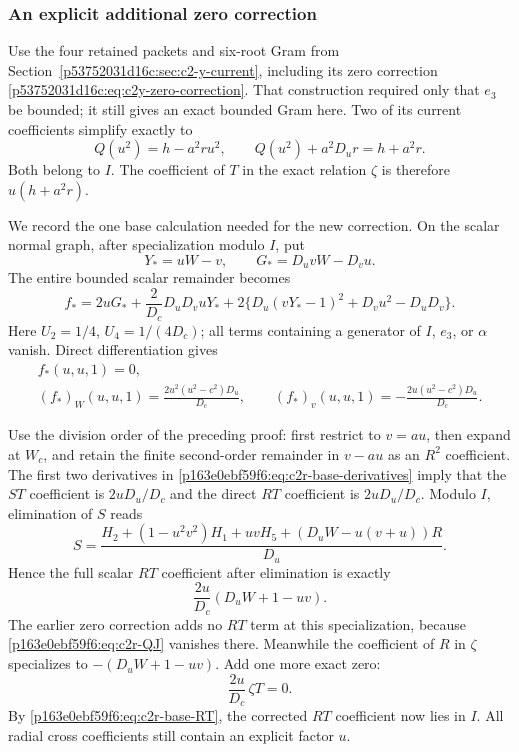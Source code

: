 \subsubsection*{An explicit additional zero correction}
Use the four retained packets and six-root Gram from
Section~\ref{p53752031d16c:sec:c2-y-current}, including its zero correction
\eqref{p53752031d16c:eq:c2y-zero-correction}.  That construction required only that
$e_3$ be bounded; it still gives an exact bounded Gram here.  Two of its
current coefficients simplify exactly to
\begin{equation}
Q(u^2)=h-a^2ru^2,\qquad Q(u^2)+a^2D_ur=h+a^2r.
\label{p163e0ebf59f6:eq:c2r-QJ}
\end{equation}
Both belong to $I$.  The coefficient of $T$ in the exact relation
$\zeta$ is therefore $u(h+a^2r)$.

We record the one base calculation needed for the new correction.
On the scalar normal graph, after specialization modulo $I$, put
\[
Y_*=uW-v,\qquad G_*=D_uvW-D_vu.
\]
The entire bounded scalar remainder becomes
\begin{equation}
f_*=2uG_*+\frac{2}{D_c}D_uD_vuY_*
 +2\{D_u(vY_*-1)^2+D_vu^2-D_uD_v\}.
\label{p163e0ebf59f6:eq:c2r-base-polynomial}
\end{equation}
Here $U_2=1/4$, $U_4=1/(4D_c)$; all terms containing a generator of
$I$, $e_3$, or $\alpha$ vanish.  Direct differentiation gives
\begin{equation}
\begin{gathered}
f_*(u,u,1)=0,\\
(f_*)_W(u,u,1)=\frac{2u^2(u^2-c^2)D_u}{D_c},\qquad
(f_*)_v(u,u,1)=-\frac{2u(u^2-c^2)D_u}{D_c}.
\end{gathered}
\label{p163e0ebf59f6:eq:c2r-base-derivatives}
\end{equation}

Use the division order of the preceding proof: first restrict to $v=au$,
then expand at $W_c$, and retain the finite second-order remainder in
$v-au$ as an $R^2$ coefficient.  The first two derivatives in
\eqref{p163e0ebf59f6:eq:c2r-base-derivatives} imply that the $ST$ coefficient is
$2uD_u/D_c$ and the direct $RT$ coefficient is $2uD_u/D_c$.
Modulo $I$, elimination of $S$ reads
\[
S=\frac{H_2+(1-u^2v^2)H_1+uvH_5
 +(D_uW-u(v+u))R}{D_u}.
\]
Hence the full scalar $RT$ coefficient after elimination is exactly
\begin{equation}
\frac{2u}{D_c}(D_uW+1-uv).
\label{p163e0ebf59f6:eq:c2r-base-RT}
\end{equation}
The earlier zero correction adds no $RT$ term at this specialization,
because \eqref{p163e0ebf59f6:eq:c2r-QJ} vanishes there.  Meanwhile the coefficient of
$R$ in $\zeta$ specializes to $-(D_uW+1-uv)$.  Add one more exact zero:
\begin{equation}
\frac{2u}{D_c}\,\zeta T=0.
\label{p163e0ebf59f6:eq:c2r-final-correction}
\end{equation}
By \eqref{p163e0ebf59f6:eq:c2r-base-RT}, the corrected $RT$ coefficient now lies in
$I$.  All radial cross coefficients still contain an explicit factor $u$.

